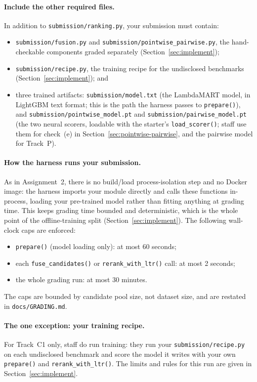 \documentclass[10pt]{article}
\begin{document}
\paragraph{Include the other required files.}
In addition to \texttt{submission/ranking.py}, your submission must contain:
\begin{itemize}
  \item \texttt{submission/fusion.py} and \texttt{submission/pointwise\_pairwise.py}, the hand-checkable components graded separately (Section~\ref{sec:implement});
  \item \texttt{submission/recipe.py}, the training recipe for the undisclosed benchmarks (Section~\ref{sec:implement}); and
  \item three trained artifacts: \texttt{submission/model.txt} (the LambdaMART model, in LightGBM text format; this is the path the harness passes to \texttt{prepare()}), and \texttt{submission/pointwise\_model.pt} and \texttt{submission/pairwise\_model.pt} (the two neural scorers, loadable with the starter's \texttt{load\_scorer()}; staff use them for check~(e) in Section~\ref{sec:pointwise-pairwise}, and the pairwise model for Track~P).
\end{itemize}

\paragraph{How the harness runs your submission.}
As in Assignment~2, there is no build/load process-isolation step and no Docker image: the harness imports your module directly and calls these functions in-process, loading your pre-trained model rather than fitting anything at grading time. This keeps grading time bounded and deterministic, which is the whole point of the offline-training split (Section~\ref{sec:implement}). The following wall-clock caps are enforced:
\begin{itemize}
  \item \texttt{prepare()} (model loading only): at most 60 seconds;
  \item each \texttt{fuse\_candidates()} or \texttt{rerank\_with\_ltr()} call: at most 2 seconds;
  \item the whole grading run: at most 30 minutes.
\end{itemize}
The caps are bounded by candidate pool size, not dataset size, and are restated in \texttt{docs/GRADING.md}.

\paragraph{The one exception: your training recipe.}
For Track~C1 only, staff do run training: they run your \texttt{submission/recipe.py} on each undisclosed benchmark and score the model it writes with your own \texttt{prepare()} and \texttt{rerank\_with\_ltr()}. The limits and rules for this run are given in Section~\ref{sec:implement}.
\end{document}
